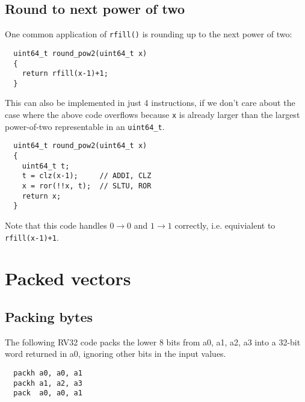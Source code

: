
\subsection{Round to next power of two}

One common application of {\tt rfill()} is rounding up to the next power of two:

\begin{minipage}{\linewidth}
\begin{verbatim}
  uint64_t round_pow2(uint64_t x)
  {
    return rfill(x-1)+1;
  }
\end{verbatim}
\end{minipage}

This can also be implemented in just 4 instructions, if we don't care about the
case where the above code overflows because {\tt x} is already larger than the
largest power-of-two representable in an {\tt uint64\_t}.

\begin{minipage}{\linewidth}
\begin{verbatim}
  uint64_t round_pow2(uint64_t x)
  {
    uint64_t t;
    t = clz(x-1);     // ADDI, CLZ
    x = ror(!!x, t);  // SLTU, ROR
    return x;
  }
\end{verbatim}
\end{minipage}

Note that this code handles $0\rightarrow{}0$ and $1\rightarrow{}1$ correctly,
i.e. equivialent to {\tt rfill(x-1)+1}.


\section{Packed vectors}


\subsection{Packing bytes}

The following RV32 code packs the lower 8 bits from a0, a1, a2, a3 into
a 32-bit word returned in a0, ignoring other bits in the input values.

\begin{minipage}{\linewidth}
\begin{verbatim}
  packh a0, a0, a1
  packh a1, a2, a3
  pack  a0, a0, a1
\end{verbatim}
\end{minipage}


